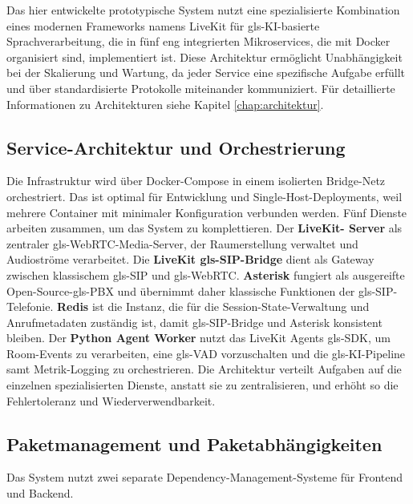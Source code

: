 Das hier entwickelte prototypische System nutzt eine spezialisierte Kombination eines modernen Frameworks namens LiveKit für \gls{gls-KI}-basierte Sprachverarbeitung, die in fünf eng integrierten Mikroservices, die mit Docker organisiert sind, implementiert ist. Diese Architektur ermöglicht Unabhängigkeit bei der Skalierung und Wartung, da jeder Service eine spezifische Aufgabe erfüllt und über standardisierte Protokolle miteinander kommuniziert. Für detaillierte Informationen zu Architekturen siehe Kapitel \ref{chap:architektur}.

\subsection{Service-Architektur und Orchestrierung}
Die Infrastruktur wird über Docker-Compose in einem isolierten Bridge-Netz orchestriert. Das ist optimal für Entwicklung und Single-Host-Deployments, weil mehrere Container mit minimaler Konfiguration verbunden werden. Fünf Dienste arbeiten zusammen, um das System zu komplettieren. Der \textbf{{LiveKit}- Server} als zentraler \gls{gls-WebRTC}-Media-Server, der Raumerstellung verwaltet und Audioströme verarbeitet. Die \textbf{{LiveKit} \gls{gls-SIP}-Bridge} dient als Gateway zwischen klassischem \gls{gls-SIP} und \gls{gls-WebRTC}. \textbf{Asterisk} fungiert als ausgereifte Open-Source-\gls{gls-PBX} und übernimmt daher klassische Funktionen der \gls{gls-SIP}-Telefonie. \textbf{Redis} ist die Instanz, die für die Session-State-Verwaltung und Anrufmetadaten zuständig ist, damit \gls{gls-SIP}-Bridge und Asterisk konsistent bleiben. Der \textbf{Python Agent Worker} nutzt das LiveKit Agents \gls{gls-SDK}, um Room-Events zu verarbeiten, eine \gls{gls-VAD} vorzuschalten und die \gls{gls-KI}-Pipeline samt Metrik-Logging zu orchestrieren. Die Architektur verteilt Aufgaben auf die einzelnen spezialisierten Dienste, anstatt sie zu zentralisieren, und erhöht so die Fehlertoleranz und Wiederverwendbarkeit.

\subsection{Paketmanagement und Paketabhängigkeiten}

Das System nutzt zwei separate Dependency-Management-Systeme für Frontend und Backend.

